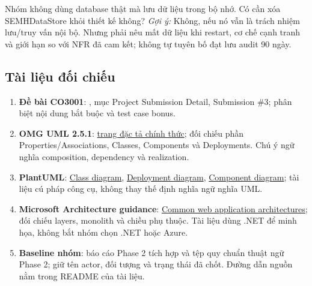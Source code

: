 Nhóm không dùng database thật mà lưu dữ liệu trong bộ nhớ. Có cần xóa SEMHDataStore khỏi thiết kế không?
\textit{Gợi ý:} Không, nếu nó vẫn là trách nhiệm lưu/truy vấn nội bộ. Nhưng phải nêu mất dữ liệu khi restart, cơ chế cạnh tranh và giới hạn so với NFR đã cam kết; không tự tuyên bố đạt lưu audit 90 ngày.

\subsection{Tài liệu đối chiếu}
\begin{enumerate}
  \item \textbf{Đề bài CO3001}: , mục Project Submission Detail, Submission \#3; phân biệt nội dung bắt buộc và test case bonus.
  \item \textbf{OMG UML 2.5.1}: \href{https://www.omg.org/spec/UML/2.5.1}{trang đặc tả chính thức}; đối chiếu phần Properties/Associations, Classes, Components và Deployments. Chú ý ngữ nghĩa composition, dependency và realization.
  \item \textbf{PlantUML}: \href{https://plantuml.com/class-diagram}{Class diagram}, \href{https://plantuml.com/deployment-diagram}{Deployment diagram}, \href{https://plantuml.com/component-diagram}{Component diagram}; tài liệu cú pháp công cụ, không thay thế định nghĩa ngữ nghĩa UML.
  \item \textbf{Microsoft Architecture guidance}: \href{https://learn.microsoft.com/en-us/dotnet/architecture/modern-web-apps-azure/common-web-application-architectures}{Common web application architectures}; đối chiếu layers, monolith và chiều phụ thuộc. Tài liệu dùng .NET để minh họa, không bắt nhóm chọn .NET hoặc Azure.
  \item \textbf{Baseline nhóm}: báo cáo Phase 2 tích hợp và tệp quy chuẩn thuật ngữ Phase 2; giữ tên actor, đối tượng và trạng thái đã chốt. Đường dẫn nguồn nằm trong README của tài liệu.
\end{enumerate}

